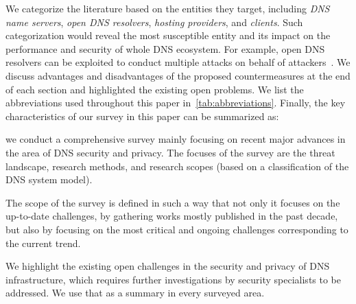 We categorize the literature based on the entities they target, including \textit{DNS name servers}, \textit{open DNS resolvers}, \textit{hosting providers}, and \textit{clients}. Such categorization would reveal the most susceptible entity and its impact on the performance and security of whole DNS ecosystem. For example, open DNS resolvers can be exploited to conduct multiple attacks on behalf of attackers~.
We discuss advantages and disadvantages of the proposed countermeasures at the end of each section and highlighted the existing open problems. We list the abbreviations used throughout this paper in~\autoref{tab:abbreviations}. Finally, the key characteristics of our survey in this paper can be summarized as: 
\begin{enumerate*}
\item we conduct a comprehensive survey mainly focusing on recent major advances in the area of DNS security and privacy. The focuses of the survey are the threat landscape, research methods, and research scopes (based on a classification of the DNS system model).
\item The scope of the survey is defined in such a way that not only it focuses on the up-to-date challenges, by gathering works mostly published in the past decade, but also by focusing on the most critical and ongoing challenges corresponding to the current trend.  
\item We highlight the existing open challenges in the security and privacy of DNS infrastructure, which requires further investigations by security specialists to be addressed. We use that as a summary in every surveyed area.
\end{enumerate*}

